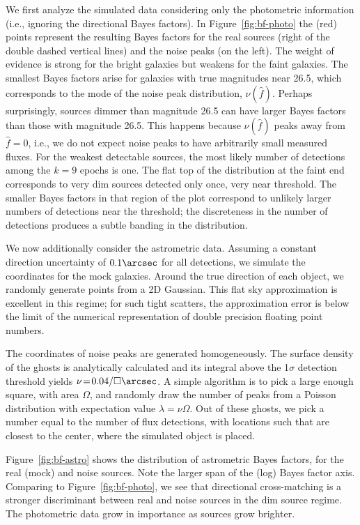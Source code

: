 \documentclass[twocolumn]{emulateapj}
\newcommand{\flux}{f}
\newcommand{\fest}{\hat{\flux}}  %
\newcommand{\npd}{\nu}  %
\begin{document}
We first analyze the simulated data considering only the photometric information (i.e., ignoring the directional Bayes factors).
In Figure~\ref{fig:bf-photo} the (red) points represent the resulting Bayes factors for the real sources (right of the double dashed vertical lines) and the noise peaks (on the left).
%
The weight of evidence is strong for the bright galaxies but weakens for the faint galaxies.
The smallest Bayes factors arise for galaxies with true magnitudes near 26.5, which corresponds to the mode of the noise peak distribution, $\npd(\fest)$.
Perhaps surprisingly, sources dimmer than magnitude 26.5 can have larger Bayes factors than those with magnitude 26.5.
This happens because $\npd(\fest)$ peaks away from $\fest=0$, i.e., we do not expect noise peaks to have arbitrarily small measured fluxes.
For the weakest detectable sources, the most likely number of detections among the $k=9$ epochs is one.
The flat top of the distribution at the faint end corresponds to very dim sources detected only once, very near threshold.
The smaller Bayes factors in that region of the plot correspond to unlikely larger numbers of detections near the threshold; the discreteness in the number of detections produces a subtle banding in the distribution.



We now additionally consider the astrometric data.
Assuming a constant direction  uncertainty of $0.1\arcsec$ for all detections, we simulate the coordinates for the mock galaxies.
Around the true direction of each object, we randomly generate points from a 2D Gaussian.
This flat sky approximation is excellent in this regime; for such tight scatters, the approximation error is below the limit of the numerical representation of double precision floating point numbers.

The coordinates of noise peaks are generated homogeneously.
%
The surface density of the ghosts is analytically calculated and its integral above the 1$\sigma$ detection threshold yields \mbox{$\nu\!=\!0.04/\square\arcsec$}.
%
A simple algorithm is to pick a large enough square, with area $\Omega$, and randomly draw the number of peaks from a Poisson distribution with expectation value $\lambda=\nu\Omega$.
Out of these ghosts, we pick a number equal to the number of flux detections, with locations such that are closest to the center, where the simulated object is placed.

Figure~\ref{fig:bf-astro} shows the distribution of astrometric Bayes factors, for the real (mock) and noise sources.
Note the larger span of the (log) Bayes factor axis.
Comparing to Figure~\ref{fig:bf-photo}, we see that directional cross-matching is a stronger discriminant between real and noise sources in the dim source regime.
The photometric data grow in importance as sources grow brighter.
\end{document}
